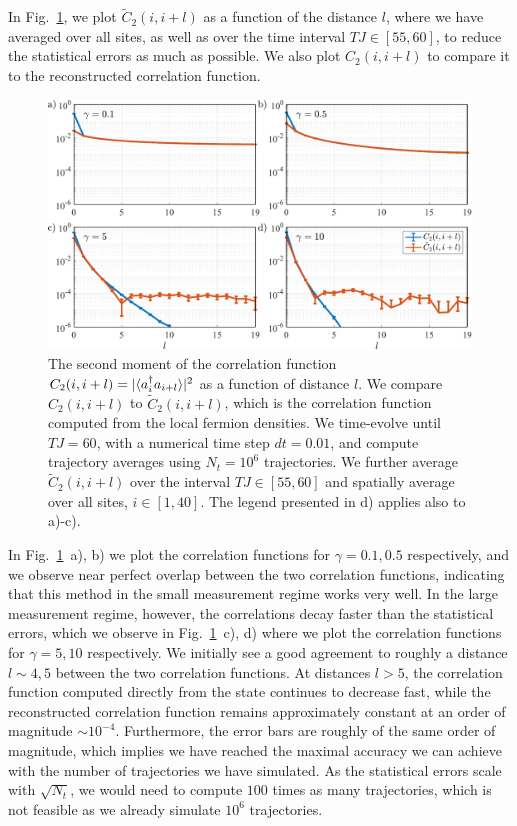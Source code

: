 In Fig.~\ref{fig:Chapter4_Fig3}, we plot $\tilde C_2(i,i+l)$ as a function of the distance $l$, where we have averaged over all sites, as well as over the time interval $TJ \in [55, 60]$, to reduce the statistical errors as much as possible. We also plot $C_2(i,i+l)$ to compare it to the reconstructed correlation function.

\begin{figure}[ht]
    \centering
    \includegraphics[width=\textwidth]{Chapters/Plots/Chapter5/Chapter4_Fig3.pdf}
    \caption{The second moment of the correlation function $C_2(i,i+l) = |\langle a_i^\dagger a_{i+l}\rangle|^2$ as a function of distance $l$. We compare $C_2(i,i+l)$ to $\tilde C_2(i,i+l)$, which is the correlation function computed from the local fermion densities. We time-evolve until $TJ = 60$, with a numerical time step $dt = 0.01$, and compute trajectory averages using $N_t = 10^6$ trajectories. We further average $\tilde C_2(i,i+l)$ over the interval $TJ\in[55,60]$ and spatially average over all sites, $i \in [1,40]$. The legend presented in d) applies also to a)-c).}
    \label{fig:Chapter4_Fig3}
\end{figure}

 In Fig.~\ref{fig:Chapter4_Fig3}~a), b) we plot the correlation functions for $\gamma = 0.1, 0.5$ respectively, and we observe near perfect overlap between the two correlation functions, indicating that this method in the small measurement regime works very well. In the large measurement regime, however, the correlations decay faster than the statistical errors, which we observe in Fig.~\ref{fig:Chapter4_Fig3}~c), d) where we plot the correlation functions for $\gamma = 5, 10$ respectively. We initially see a good agreement to roughly a distance $l \sim 4,5$ between the two correlation functions. At distances $l > 5$, the correlation function computed directly from the state continues to decrease fast, while the reconstructed correlation function remains approximately constant at an order of magnitude $\sim 10^{-4}$. Furthermore, the error bars are roughly of the same order of magnitude, which implies we have reached the maximal accuracy we can achieve with the number of trajectories we have simulated. As the statistical errors scale with $\sqrt{N_t}$, we would need to compute $100$ times as many trajectories, which is not feasible as we already simulate $10^6$ trajectories.

